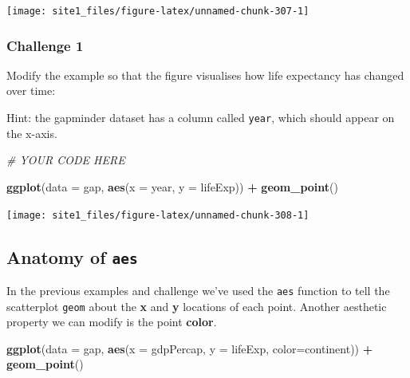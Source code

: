 \documentclass[]{book}
\newenvironment{Shaded}{\begin{snugshade}}{\end{snugshade}}
\newcommand{\KeywordTok}[1]{\textcolor[rgb]{0.13,0.29,0.53}{\textbf{#1}}}
\newcommand{\DataTypeTok}[1]{\textcolor[rgb]{0.13,0.29,0.53}{#1}}
\newcommand{\StringTok}[1]{\textcolor[rgb]{0.31,0.60,0.02}{#1}}
\newcommand{\CommentTok}[1]{\textcolor[rgb]{0.56,0.35,0.01}{\textit{#1}}}
\newcommand{\OperatorTok}[1]{\textcolor[rgb]{0.81,0.36,0.00}{\textbf{#1}}}
\newcommand{\NormalTok}[1]{#1}
\begin{document}
\begin{center}\texttt{[image: site1\_files/figure-latex/unnamed-chunk-307-1]} \end{center}

\subsubsection*{Challenge 1}\label{challenge-1-1}

Modify the example so that the figure visualises how life expectancy has
changed over time:

Hint: the gapminder dataset has a column called \texttt{year}, which
should appear on the x-axis.

\begin{Shaded}
\begin{Highlighting}[]
\CommentTok{# YOUR CODE HERE}

\KeywordTok{ggplot}\NormalTok{(}\DataTypeTok{data =}\NormalTok{ gap, }\KeywordTok{aes}\NormalTok{(}\DataTypeTok{x =}\NormalTok{ year, }\DataTypeTok{y =}\NormalTok{ lifeExp)) }\OperatorTok{+}\StringTok{ }
\StringTok{  }\KeywordTok{geom_point}\NormalTok{()}
\end{Highlighting}
\end{Shaded}

\begin{center}\texttt{[image: site1\_files/figure-latex/unnamed-chunk-308-1]} \end{center}

\subsection{\texorpdfstring{Anatomy of
\texttt{aes}}{Anatomy of aes}}\label{anatomy-of-aes}

In the previous examples and challenge we've used the \texttt{aes}
function to tell the scatterplot \texttt{geom} about the \textbf{x} and
\textbf{y} locations of each point. Another aesthetic property we can
modify is the point \textbf{color}.

\begin{Shaded}
\begin{Highlighting}[]
\KeywordTok{ggplot}\NormalTok{(}\DataTypeTok{data =}\NormalTok{ gap, }\KeywordTok{aes}\NormalTok{(}\DataTypeTok{x =}\NormalTok{ gdpPercap, }\DataTypeTok{y =}\NormalTok{ lifeExp, }\DataTypeTok{color=}\NormalTok{continent)) }\OperatorTok{+}\StringTok{ }
\StringTok{  }\KeywordTok{geom_point}\NormalTok{()}
\end{Highlighting}
\end{Shaded}
\end{document}
